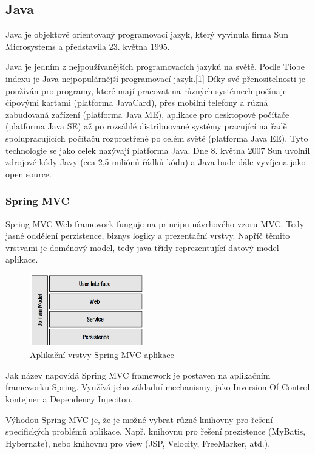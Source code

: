 \subsection{Java}
Java je objektově orientovaný programovací jazyk, který vyvinula firma Sun Microsystems a představila 23. května 1995.

Java je jedním z nejpoužívanějších programovacích jazyků na světě. Podle Tiobe indexu je Java nejpopulárnější programovací jazyk.[1] Díky své přenositelnosti je používán pro programy, které mají pracovat na různých systémech počínaje čipovými kartami (platforma JavaCard), přes mobilní telefony a různá zabudovaná zařízení (platforma Java ME), aplikace pro desktopové počítače (platforma Java SE) až po rozsáhlé distribuované systémy pracující na řadě spolupracujících počítačů rozprostřené po celém světě (platforma Java EE). Tyto technologie se jako celek nazývají platforma Java. Dne 8. května 2007 Sun uvolnil zdrojové kódy Javy (cca 2,5 miliónů řádků kódu) a Java bude dále vyvíjena jako open source.
\subsubsection{Spring MVC}
Spring MVC Web framework funguje na principu návrhového vzoru MVC. Tedy jasné oddělení perzistence, biznys logiky a prezentační vrstvy. Napříč těmito vrstvami je doménový model, tedy java třídy reprezentující datový model aplikace\cite{liu2006research}.

\begin{figure}[htb]
\begin{center}
\includegraphics[width=50mm]{./pictures/spring-mvc-layers.png}
\caption{Aplikační vrstvy Spring MVC aplikace \cite{liu2006research}}
\label{fig:spring-mvc-layers}
\end{center}
\end{figure}

Jak název napovídá Spring MVC framework je postaven na aplikačním frameworku Spring. Využívá jeho základní mechanismy, jako Inversion Of Control kontejner a Dependency Injeciton.

Výhodou Spring MVC je, že je možné vybrat různé knihovny pro řešení specifických problémů aplikace. Např. knihovnu pro řešení prezistence (MyBatis, Hybernate), nebo knihovnu pro view (JSP, Velocity, FreeMarker, atd.)\cite{liu2006research}.

